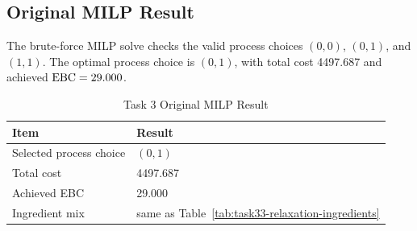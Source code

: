 \subsection{Original MILP Result}
\label{sec:task3-milp}
The brute-force MILP solve checks the valid process choices $(0,0)$, $(0,1)$, and $(1,1)$. The optimal process choice is $(0,1)$, with total cost 4497.687 and achieved $\mathrm{EBC}=29.000$.

\begin{table}[H]
\renewcommand{\arraystretch}{1.15}
\caption{Task 3 Original MILP Result}
\label{tab:task33-milp}
\centering
\small
\begin{tabular}{@{}ll@{}}
\toprule
Item & Result \\
\midrule
Selected process choice & $(0,1)$ \\
Total cost & 4497.687 \\
Achieved EBC & 29.000 \\
Ingredient mix & same as Table~\ref{tab:task33-relaxation-ingredients} \\
\bottomrule
\end{tabular}
\end{table}

